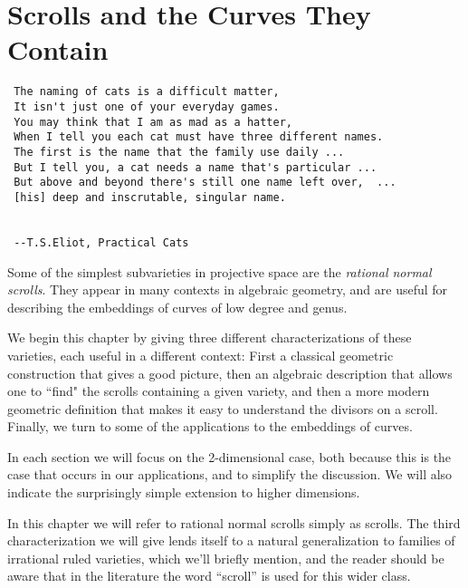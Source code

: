 

\chapter{Scrolls and the Curves They Contain}
\label{ScrollsChapter}

\begin{verbatim}
 The naming of cats is a difficult matter,
 It isn't just one of your everyday games.
 You may think that I am as mad as a hatter,
 When I tell you each cat must have three different names.
 The first is the name that the family use daily ...
 But I tell you, a cat needs a name that's particular ...
 But above and beyond there's still one name left over,  ...
 [his] deep and inscrutable, singular name.

 
 --T.S.Eliot, Practical Cats
\end{verbatim}


Some of the simplest subvarieties in projective space are the \emph{rational normal scrolls}. They appear in many contexts in algebraic geometry, and are useful for describing the embeddings of curves of low degree and genus. 

We begin this chapter by giving three different characterizations of these varieties, each useful in a different context: First a classical geometric construction that gives a good picture, then an algebraic description that allows one to ``find" the scrolls containing a given variety, and then a more modern geometric definition that makes it easy to understand the divisors on a scroll. Finally, we turn to some of the applications to the embeddings of curves.

In each section we will focus on the 2-dimensional case, both because this is the case that occurs in our applications, and to simplify the discussion. We will also indicate the surprisingly simple extension to higher dimensions.

In this chapter we will refer to rational normal scrolls simply as scrolls. The third characterization we will give lends itself to a natural generalization to families of irrational ruled varieties, which we'll briefly mention, and the reader should be aware that in the literature the word ``scroll'' is used for this wider class.

